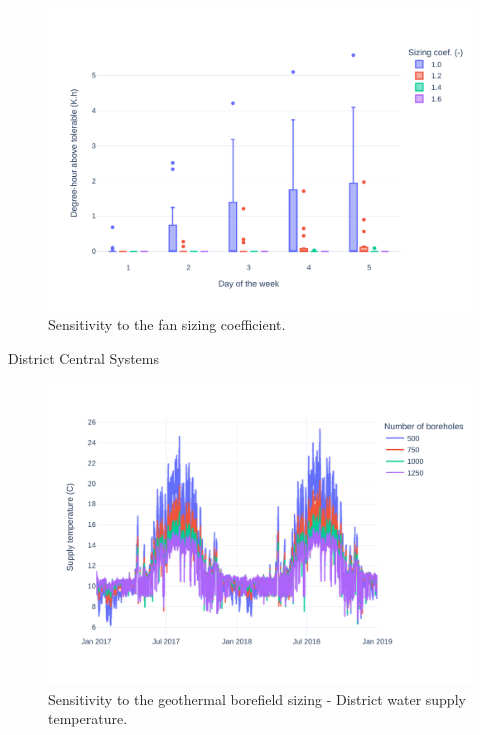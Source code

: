 \begin{figure}[h!]
\centering
\includegraphics[width=\linewidth]{figures/FanSizing.pdf}
\caption{Sensitivity to the fan sizing coefficient.}
\label{fig:fan}
\end{figure}

District Central Systems

\begin{figure}[h!]
\centering
\includegraphics[width=\linewidth]{figures/GeoSizing.pdf}
\caption{Sensitivity to the geothermal borefield sizing - District water supply temperature.}
\label{fig:fan}
\end{figure}

